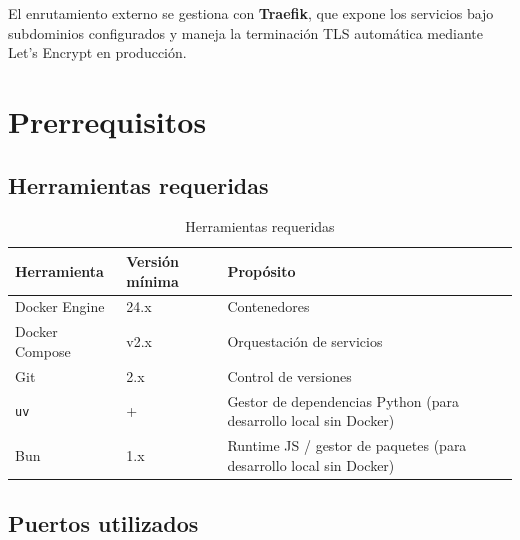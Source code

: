 El enrutamiento externo se gestiona con \textbf{Traefik}, que expone los servicios bajo subdominios configurados y maneja la terminación TLS automática mediante Let's Encrypt en producción.

\section{Prerrequisitos}\label{prerrequisitos}

\subsection{Herramientas requeridas}\label{herramientas-requeridas}

\begin{longtable}[]{@{}
  >{\raggedright\arraybackslash}p{}
  >{\raggedright\arraybackslash}p{}
  >{\raggedright\arraybackslash}p{}@{}}
\caption[Herramientas requeridas]{Herramientas requeridas}\tabularnewline
\toprule\noalign{}
\begin{minipage}[b]{\linewidth}\raggedright
Herramienta
\end{minipage} & \begin{minipage}[b]{\linewidth}\raggedright
Versión mínima
\end{minipage} & \begin{minipage}[b]{\linewidth}\raggedright
Propósito
\end{minipage} \\
\midrule\noalign{}
\endhead
\bottomrule\noalign{}
\endlastfoot
Docker Engine & 24.x & Contenedores \\
Docker Compose & v2.x & Orquestación de servicios \\
Git & 2.x & Control de versiones \\
\texttt{uv} & 0.4+ & Gestor de dependencias Python (para desarrollo local sin Docker) \\
Bun & 1.x & Runtime JS / gestor de paquetes (para desarrollo local sin Docker) \\
\end{longtable}

\subsection{Puertos utilizados}\label{puertos-utilizados}

